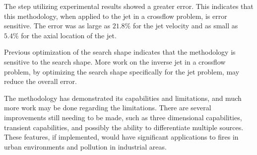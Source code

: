 \documentclass[preprint,12pt]{elsarticle}
\begin{document}
The step utilizing experimental results showed a greater error.  This indicates that this methodology, when applied to the jet in a crossflow problem, is error sensitive.  The error was as large as $21.8\%$ for the jet velocity and as small as $5.4\%$ for the axial location of the jet.

Previous optimization of the search shape indicates that the methodology is sensitive to the search shape\cite{ijhmt2}.  More work on the inverse jet in a crossflow problem, by optimizing the search shape specifically for the jet problem, may reduce the overall error.

The methodology has demonstrated its capabilities and limitations, and much more work may be done regarding the limitations.  There are several improvements still needing to be made, such as three dimensional capabilities, transient capabilities, and possibly the ability to differentiate multiple sources.  These features, if implemented, would have significant applications to fires in urban environments and pollution in industrial areas.
\appendix

{}

\end{document}

